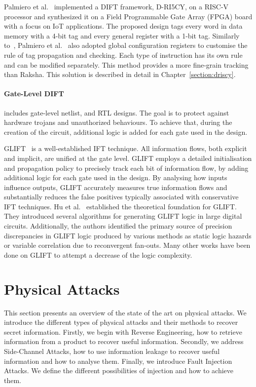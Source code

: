 Palmiero et al.~\cite{PDGLC-18-hpec} implemented a DIFT framework, D-RI5CY, on a RISC-V processor and synthesized it on a Field Programmable Gate Array (FPGA) board with a focus on IoT applications. The proposed design tags every word in data memory with a 4-bit tag and every general register with a 1-bit tag. Similarly to~\cite{DKK-07-sigarch}, Palmiero et al.~\cite{PDGLC-18-hpec} also adopted global configuration registers to customise the rule of tag propagation and checking. Each type of instruction has its own rule and can be modified separately. This method provides a more fine-grain tracking than Raksha. This solution is described in detail in Chapter~\ref{section:driscy}.

\paragraph{Gate-Level DIFT} includes gate-level netlist, and RTL designs. The goal is to protect against hardware trojans and unauthorized behaviours. To achieve that, during the creation of the circuit, additional logic is added for each gate used in the design.

GLIFT~\cite{TWMMCS-09-asplos} is a well-established IFT technique. All information flows, both explicit and implicit, are unified at the gate level. GLIFT employs a detailed initialisation and propagation policy to precisely track each bit of information flow, by adding additional logic for each gate used in the design. By analysing how inputs influence outputs, GLIFT accurately measures true information flows and substantially reduces the false positives typically associated with conservative IFT techniques.
Hu et al.~\cite{HOITSMK-11-tcad} established the theoretical foundation for GLIFT. They introduced several algorithms for generating GLIFT logic in large digital circuits. Additionally, the authors identified the primary source of precision discrepancies in GLIFT logic produced by various methods as static logic hazards or variable correlation due to reconvergent fan-outs. Many other works have been done on GLIFT to attempt a decrease of the logic complexity.

\section{Physical Attacks}
\label{section:physicalAttacks}

This section presents an overview of the state of the art on physical attacks. We introduce the different types of physical attacks and their methods to recover secret information. Firstly, we begin with Reverse Engineering, how to retrieve information from a product to recover useful information.
Secondly, we address Side-Channel Attacks, how to use information leakage to recover useful information and how to analyse them.
Finally, we introduce Fault Injection Attacks. We define the different possibilities of injection and how to achieve them.

